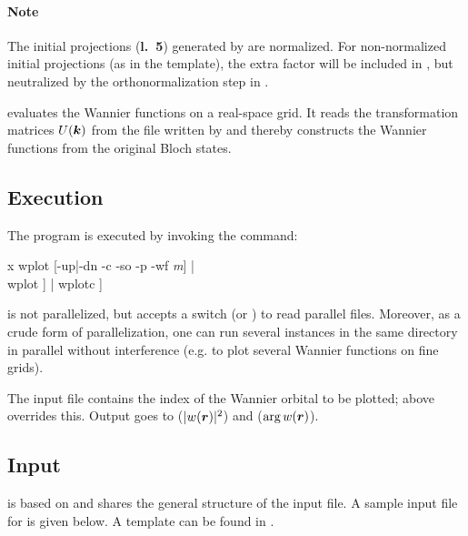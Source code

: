 \paragraph{Note} The initial projections (\textbf{l.~5}) generated by
\writeinwf are normalized.  For non-normalized initial projections (as
in the template), the extra factor will be included in
, but neutralized by the orthonormalization step in
\wannier.



\wplot evaluates the Wannier functions on a real-space grid.  It reads
the transformation matrices $U(\boldsymbol k)$ from the file 
written by \wannierx and thereby constructs the Wannier functions from
the original \wien Bloch states.

\subsection{Execution}

The program \wplot is executed by invoking the command:
%
\begin{usage}
  x wplot [-up|-dn -c -so -p -wf \textit{m}]   |
  \\
  wplot  \deffile [\textit{m} [\#proc]] |
  wplotc \deffile [\textit{m} [\#proc]]
\end{usage}
%
\wplot is not parallelized, but accepts a  switch (or
) to read parallel  files.  Moreover, as a
crude form of parallelization, one can run several \wplot instances in
the same directory in parallel without interference (e.g. to plot
several Wannier functions on fine grids).

The input file contains the index of the Wannier orbital to be
plotted;  above overrides this.  Output goes to
 ($|w(\boldsymbol r)|^2$) and
 ($\arg w(\boldsymbol r)$).

\subsection{Input}

\wplot is based on  and shares the general structure of
the input file.  A sample input file for  is given below.
A template can be found in .
%
%

